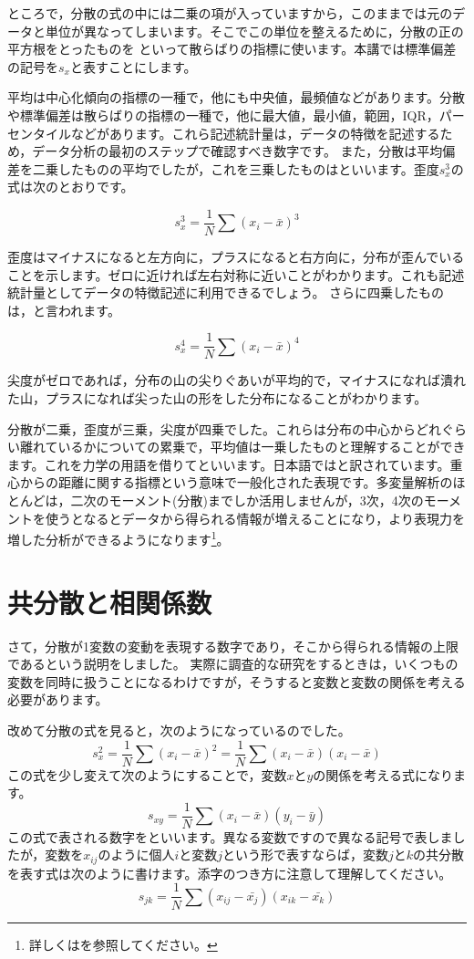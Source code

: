 \documentclass{ltjsbook}
\begin{document}
ところで，分散の式の中には二乗の項が入っていますから，このままでは元のデータと単位が異なってしまいます。そこでこの単位を整えるために，分散の正の平方根をとったものを といって散らばりの指標に使います。本講では標準偏差の記号を$s_x$と表すことにします。

平均は中心化傾向の指標の一種で，他にも中央値，最頻値などがあります。分散や標準偏差は散らばりの指標の一種で，他に最大値，最小値，範囲，IQR，パーセンタイルなどがあります。これら記述統計量は，データの特徴を記述するため，データ分析の最初のステップで確認すべき数字です。
また，分散は平均偏差を二乗したものの平均でしたが，これを三乗したものはといいます。歪度$s_x^3$の式は次のとおりです。

\[ s_x^3 = \frac{1}{N}\sum (x_i - \bar{x})^3 \]

歪度はマイナスになると左方向に，プラスになると右方向に，分布が歪んでいることを示します。ゼロに近ければ左右対称に近いことがわかります。これも記述統計量としてデータの特徴記述に利用できるでしょう。
さらに四乗したものは，と言われます。

\[ s_x^4 = \frac{1}{N}\sum (x_i - \bar{x})^4 \]

尖度がゼロであれば，分布の山の尖りぐあいが平均的で，マイナスになれば潰れた山，プラスになれば尖った山の形をした分布になることがわかります。

分散が二乗，歪度が三乗，尖度が四乗でした。これらは分布の中心からどれぐらい離れているかについての累乗で，平均値は一乗したものと理解することができます。これを力学の用語を借りてといいます。日本語ではと訳されています。重心からの距離に関する指標という意味で一般化された表現です。多変量解析のほとんどは，二次のモーメント(分散)までしか活用しませんが，3次，4次のモーメントを使うとなるとデータから得られる情報が増えることになり，より表現力を増した分析ができるようになります\footnote{詳しくは\textcite{Toyoda2007}を参照してください。}。

\section{共分散と相関係数}
さて，分散が1変数の変動を表現する数字であり，そこから得られる情報の上限であるという説明をしました。
実際に調査的な研究をするときは，いくつもの変数を同時に扱うことになるわけですが，そうすると変数と変数の関係を考える必要があります。

改めて分散の式を見ると，次のようになっているのでした。
\[  s_x^2 = \frac{1}{N}\sum (x_i - \bar{x})^2 = \frac{1}{N}\sum (x_i - \bar{x})(x_i - \bar{x}) \]
この式を少し変えて次のようにすることで，変数$x$と$y$の関係を考える式になります。
\[ s_{xy} = \frac{1}{N} \sum(x_i-\bar{x})(y_i-\bar{y})\]
この式で表される数字をといいます。異なる変数ですので異なる記号で表しましたが，変数を$x_{ij}$のように個人$i$と変数$j$という形で表すならば，変数$j$と$k$の共分散を表す式は次のように書けます。添字のつき方に注意して理解してください。
\[ s_{jk} = \frac{1}{N} \sum (x_{ij} - \bar{x_j})(x_{ik} - \bar{x_k}) \]
\end{document}
